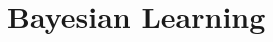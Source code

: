 
\chapter{Bayesian Learning} \label{sec:bayes}


\begin{learningobjectives}
\item \TODO
\end{learningobjectives}

\dependencies{}

\begin{exercises}
\begin{Ex}
\TODO

\begin{solution}
\TODO
\end{solution}
\end{Ex}

\end{exercises}
